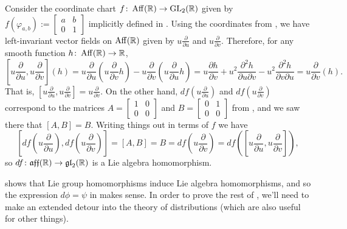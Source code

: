 \begin{example}
	Consider the coordinate chart $f \colon\thinspace\! \operatorname{Aff}(\mathbb{R}) \to \operatorname{GL}_2(\mathbb{R})$ given by $f(\varphi_{a,b}) := \begin{bmatrix} a & b \\ 0 & 1 \end{bmatrix}$ implicitly defined in . Using the coordinates from , we have left-invariant vector fields on $\operatorname{Aff}(\mathbb{R})$ given by $u \frac{\partial}{\partial u}$ and $u \frac{\partial}{\partial v}$. Therefore, for any smooth function $h \colon\thinspace\! \operatorname{Aff}(\mathbb{R}) \to \mathbb{R}$,
	\[
		\left[u \frac{\partial}{\partial u},u \frac{\partial}{\partial v}\right](h) = u \frac{\partial}{\partial u}\left(u \frac{\partial}{\partial v} h\right) - u \frac{\partial}{\partial v}\left(u \frac{\partial}{\partial u} h\right) = u \frac{\partial h}{\partial v} + u^2 \frac{\partial^2 h}{\partial u \partial v} - u^2 \frac{\partial^2 h}{\partial v \partial u} = u \frac{\partial}{\partial v}(h).
	\]
	That is, $\left[u \frac{\partial}{\partial u},u \frac{\partial}{\partial v}\right] =u \frac{\partial}{\partial v}$. On the other hand, $df\left(u \frac{\partial}{\partial u} \right)$ and $df\left(u \frac{\partial}{\partial v} \right)$ correspond to the matrices $A = \begin{bmatrix} 1 & 0 \\ 0 & 0 \end{bmatrix}$ and $B = \begin{bmatrix} 0 & 1 \\ 0 & 0 \end{bmatrix}$ from , and we saw there that $[A,B] = B$. Writing things out in terms of $f$ we have
	\[
		\left[df\left(u \frac{\partial}{\partial u} \right), df\left(u \frac{\partial}{\partial v} \right)\right] = [A,B] = B =  df\left(u \frac{\partial}{\partial v} \right) = df \left( \left[ u \frac{\partial}{\partial u}, u \frac{\partial}{\partial v}\right]\right),
	\]
	so $df \colon\thinspace\! \mathfrak{aff}(\mathbb{R})  \to \mathfrak{gl}_2(\mathbb{R})$ is a Lie algebra homomorphism.
\end{example}

 shows that Lie group homomorphisms induce Lie algebra homomorphisms, and so the expression $d\phi = \psi$ in  makes sense. In order to prove the rest of , we'll need to make an extended detour into the theory of distributions (which are also useful for other things). 